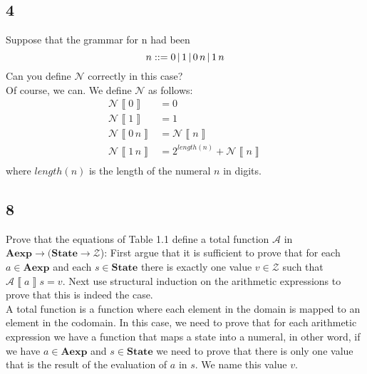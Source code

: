 \documentclass[spanish, a4paper, 12pt] {article}
\newcommand{\aexp}[0]{\textbf{Aexp}}
\newcommand{\state}[0]{\textbf{State}}
\newcommand{\A}[0]{\mathcal{A}}
\newcommand{\N}[0]{\mathcal{N}}
\newcommand{\Z}[0]{\mathcal{Z}}
\newcommand{\eval}[1]{\left\llbracket #1 \right\rrbracket}
\renewcommand{\=}[0]{:=}
\renewcommand{\;}[0]{\mbox{; }}
\begin{document}
\subsection{4}
Suppose that the grammar for n had been
$$n\space::= 0 \,|\, 1 \,|\, 0 \, n \,|\, 1 \, n$$
Can you define $\N$ correctly in this case?\\

Of course, we can. We define $\N$ as follows:
\begin{align*}
    \N\eval{0} &= 0\\
    \N\eval{1} &= 1\\
    \N\eval{0\,n} &= \N\eval{n}\\
    \N\eval{1\,n} &= 2^{length(n)} + \N\eval{n}\\
\end{align*}
where $length(n)$ is the length of the numeral $n$ in digits.
\subsection{8}
Prove that the equations of Table 1.1 define a total function $\A$ in $\aexp \rightarrow (\state \rightarrow \Z$): First argue that it is sufficient to prove that for each $a \in \aexp$ and each $s \in \state$ there is exactly one value $v \in \Z$ such that $\A\eval{a}s = v$. Next use structural induction on the arithmetic expressions to prove that this is indeed the case.\\

A total function is a function where each element in the domain is mapped to an element in the codomain. In this case, we need to prove that for each arithmetic expression we have a function that maps a state into a numeral, in other word, if we have $a \in \aexp$ and $s \in \state$ we need to prove that there is only one value that is the result of the evaluation of $a$ in $s$. We name this value $v$.\\
\end{document}
